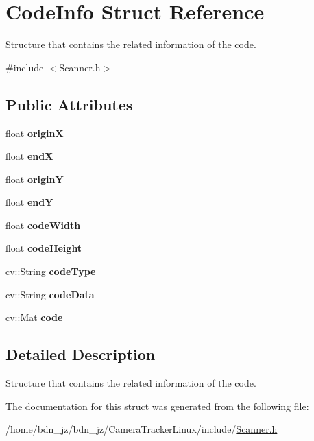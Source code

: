 \hypertarget{structCodeInfo}{}\section{Code\+Info Struct Reference}
\label{structCodeInfo}


Structure that contains the related information of the code.  




{\ttfamily \#include $<$Scanner.\+h$>$}

\subsection*{Public Attributes}
\begin{DoxyCompactItemize}
\item 
\mbox{\label{structCodeInfo_aaf7a04108a44c795809b1c0322f53a9b}} 
float {\bfseries originX}
\item 
\mbox{\label{structCodeInfo_afcbf3d398415769aba6f875c29395ec7}} 
float {\bfseries endX}
\item 
\mbox{\label{structCodeInfo_aa4dab88d16276786b4556f021fd192f7}} 
float {\bfseries originY}
\item 
\mbox{\label{structCodeInfo_a8d3d91e8e32d9294b514950029755841}} 
float {\bfseries endY}
\item 
\mbox{\label{structCodeInfo_ab8493ec1c1f670d1060bde6c261f9e80}} 
float {\bfseries code\+Width}
\item 
\mbox{\label{structCodeInfo_a8035a0d0891b25d59693e23f192e3a29}} 
float {\bfseries code\+Height}
\item 
\mbox{\label{structCodeInfo_aa93c41fefb9505ee55963d60ec1299e7}} 
cv\+::\+String {\bfseries code\+Type}
\item 
\mbox{\label{structCodeInfo_a01341cc7b99f93fbdd052f6d3e5b1e20}} 
cv\+::\+String {\bfseries code\+Data}
\item 
\mbox{\label{structCodeInfo_aeaec8d442ba7cf5b8a946f3da849ebfe}} 
cv\+::\+Mat {\bfseries code}
\end{DoxyCompactItemize}


\subsection{Detailed Description}
Structure that contains the related information of the code. 

The documentation for this struct was generated from the following file\+:\begin{DoxyCompactItemize}
\item 
/home/bdn\+\_\+jz/bdn\+\_\+jz/\+Camera\+Tracker\+Linux/include/\hyperlink{Scanner_8h}{Scanner.\+h}\end{DoxyCompactItemize}
